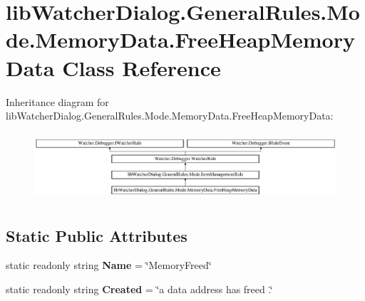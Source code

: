 \hypertarget{classlib_watcher_dialog_1_1_general_rules_1_1_mode_1_1_memory_data_1_1_free_heap_memory_data}{\section{lib\+Watcher\+Dialog.\+General\+Rules.\+Mode.\+Memory\+Data.\+Free\+Heap\+Memory\+Data Class Reference}
\label{classlib_watcher_dialog_1_1_general_rules_1_1_mode_1_1_memory_data_1_1_free_heap_memory_data}
}
Inheritance diagram for lib\+Watcher\+Dialog.\+General\+Rules.\+Mode.\+Memory\+Data.\+Free\+Heap\+Memory\+Data\+:\begin{figure}[H]
\begin{center}
\leavevmode
\includegraphics[height=2.539683cm]{classlib_watcher_dialog_1_1_general_rules_1_1_mode_1_1_memory_data_1_1_free_heap_memory_data}
\end{center}
\end{figure}
\subsection*{Static Public Attributes}
\begin{DoxyCompactItemize}
\item 
\hypertarget{classlib_watcher_dialog_1_1_general_rules_1_1_mode_1_1_memory_data_1_1_free_heap_memory_data_a8891328c450102af2cafb37c06c0eab5}{static readonly string {\bfseries Name} = \char`\"{}Memory\+Freed\char`\"{}}\label{classlib_watcher_dialog_1_1_general_rules_1_1_mode_1_1_memory_data_1_1_free_heap_memory_data_a8891328c450102af2cafb37c06c0eab5}

\item 
\hypertarget{classlib_watcher_dialog_1_1_general_rules_1_1_mode_1_1_memory_data_1_1_free_heap_memory_data_af4cb5d18ab5542b0afb24495710221de}{static readonly string {\bfseries Created} = \char`\"{}a data address has freed .\char`\"{}}\label{classlib_watcher_dialog_1_1_general_rules_1_1_mode_1_1_memory_data_1_1_free_heap_memory_data_af4cb5d18ab5542b0afb24495710221de}

\end{DoxyCompactItemize}
